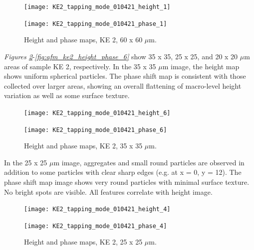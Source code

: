 \begin{figure}[H]
\centering
\begin{minipage}{.45\textwidth}
  \centering
  \texttt{[image: KE2\_tapping\_mode\_010421\_height\_1]}
\end{minipage}
\begin{minipage}{.45\textwidth}
  \centering
  \texttt{[image: KE2\_tapping\_mode\_010421\_phase\_1]}
\end{minipage}
\caption[Height and phase maps, KE 2]{Height and phase maps, KE 2, 60 x 60 $\mu$m.}
\label{fig:afm_ke2_height_phase_3}
\end{figure}

\textit{Figures \ref{fig:afm_ke2_height_phase_4}}-\textit{\ref{fig:afm_ke2_height_phase_6}} show 35 x 35, 25 x 25, and 20 x 20 $\mu$m areas of sample KE 2, respectively. In the 35 x 35 $\mu$m image, the height map shows uniform spherical particles. The phase shift map is consistent with those collected over larger areas, showing an overall flattening of macro-level height variation as well as some surface texture.

\begin{figure}[H]
\centering
\begin{minipage}{.45\textwidth}
  \centering
  \texttt{[image: KE2\_tapping\_mode\_010421\_height\_6]}
\end{minipage}
\begin{minipage}{.45\textwidth}
  \centering
  \texttt{[image: KE2\_tapping\_mode\_010421\_phase\_6]}
\end{minipage}
\caption[Height and phase maps, KE 2]{Height and phase maps, KE 2, 35 x 35 $\mu$m.}
\label{fig:afm_ke2_height_phase_4}
\end{figure}

In the 25 x 25 $\mu$m image, aggregates and small round particles are observed in addition to some particles with clear sharp edges (e.g. at x = 0, y = 12). The phase shift map image shows very round particles with minimal surface texture. No bright spots are visible. All features correlate with height image. 

\begin{figure}[H]
\centering
\begin{minipage}{.45\textwidth}
  \centering
  \texttt{[image: KE2\_tapping\_mode\_010421\_height\_4]}
\end{minipage}
\begin{minipage}{.45\textwidth}
  \centering
  \texttt{[image: KE2\_tapping\_mode\_010421\_phase\_4]}
\end{minipage}
\caption[Height and phase maps, KE 2]{Height and phase maps, KE 2, 25 x 25 $\mu$m.}
\label{fig:afm_ke2_height_phase_5}
\end{figure}

